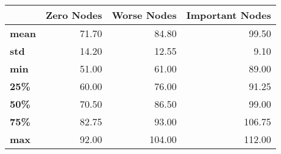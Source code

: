 \begin{tabular}{lrrr}
\toprule
{} &  Zero Nodes &  Worse Nodes &  Important Nodes \\
\midrule
\textbf{mean} &       71.70 &        84.80 &            99.50 \\
\textbf{std } &       14.20 &        12.55 &             9.10 \\
\textbf{min } &       51.00 &        61.00 &            89.00 \\
\textbf{25\% } &       60.00 &        76.00 &            91.25 \\
\textbf{50\% } &       70.50 &        86.50 &            99.00 \\
\textbf{75\% } &       82.75 &        93.00 &           106.75 \\
\textbf{max } &       92.00 &       104.00 &           112.00 \\
\bottomrule
\end{tabular}
